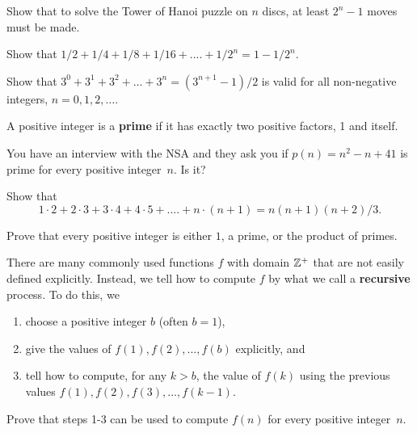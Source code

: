 \begin{prb}
Show that to solve the Tower of Hanoi puzzle on $n$ discs, at least $2^n-1$ moves must be made.
\end{prb}

\begin{prb}
Show that $1/2 + 1/4 + 1/8 + 1/16 + .... + 1/2^n =  1 - 1/2^n$.
\end{prb}

\begin{prb}
Show that $3^0 + 3^1 + 3^2 + \dots + 3^n  =  (3^{n+1} - 1)/2$ is valid for all non-negative integers, $n=0,1,2,\dots$.
\end{prb}

\begin{dfn}
A positive integer is a \textbf{prime} if it has exactly two positive factors, 1 and itself.
\end{dfn}

\begin{prb}
You have an interview with the NSA and they ask you if $p(n) = n^2 - n + 41$ is prime for every positive integer~$n$. Is it?
\end{prb}


\begin{prb}
Show that $$1\cdot 2 + 2\cdot 3 + 3\cdot 4 + 4\cdot 5 + .... + n\cdot (n+1) =  n(n+1)(n+2)/3.$$
\end{prb}

\begin{prb}\label{prb:factoring}
Prove that every positive integer is either $1$, a prime, or the product of primes.
\end{prb}

\begin{prb}
There are many commonly used functions $f$ with domain $\mathbb Z^+$ that are not easily defined explicitly. Instead, we tell how to compute $f$ by what we call a \textbf{recursive} process.  To do this, we
\begin{enumerate}
\item choose a positive integer $b$ (often $b = 1$),
\item give the values of  $f(1), f(2),...,f(b)$  explicitly, and
\item tell how to compute, for any  $k > b$, the value of  $f(k)$
using the previous values  $f(1), f(2), f(3), ..., f(k-1)$.
\end{enumerate}
Prove that steps 1-3 can be used to compute $f(n)$ for every positive integer~$n$.
\end{prb}
\medskip

